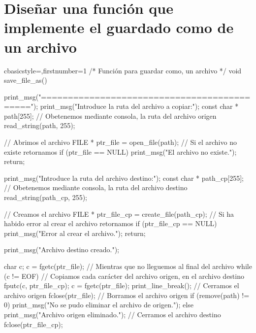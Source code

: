 \section{Diseñar una función que implemente el guardado como de un archivo}
	\begin{sourcecodep}[]{c}{basicstyle={\fontsize{10}{10}\selectfont\ttfamily},firstnumber=1}{}
/*
	Función para guardar como, un archivo
*/
void save_file_as() {
	print_msg("============================================");
	print_msg("Introduce la ruta del archivo a copiar:");
	const char * path[255];
	// Obetenemos mediante consola, la ruta del archivo origen
	read_string(path, 255);
	
	// Abrimos el archivo
	FILE * ptr_file = open_file(path);
	// Si el archivo no existe retornamos
	if (ptr_file == NULL)
	{
		print_msg("El archivo no existe.");
		return;
	}
	
	print_msg("Introduce la ruta del archivo destino:");
	const char * path_cp[255];
	// Obetenemos mediante consola, la ruta del archivo destino
	read_string(path_cp, 255);
	
	// Creamos el archivo
	FILE * ptr_file_cp = create_file(path_cp);
	// Si ha habido error al crear el archivo retornamos
	if (ptr_file_cp == NULL)
	{
		print_msg("Error al crear el archivo.");
		return;
	}
	
	print_msg("Archivo destino creado.");
	
	char c;
	c = fgetc(ptr_file);
	// Mientras que no lleguemos al final del archivo
	while (c != EOF)
	{
		// Copiamos cada carácter del archivo origen, en el archivo destino
		fputc(c, ptr_file_cp);
		c = fgetc(ptr_file);
	}
	print_line_break();
	// Cerramos el archivo origen
	fclose(ptr_file);
	// Borramos el archivo origen
	if (remove(path) != 0)
		print_msg("No se pudo eliminar el archivo de origen.");
	else
		print_msg("Archivo origen eliminado.");
	// Cerramos el archivo destino
	fclose(ptr_file_cp);
}\end{sourcecodep}
\newpage
